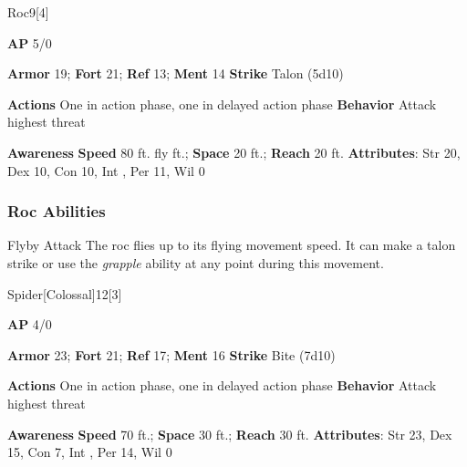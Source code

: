 \begin{monsection}{Roc}{9}[4]
\vspace{-1em}\vspace{-1em}
\begin{spellcontent}
\begin{spelltargetinginfo}
{\textbf{AP} 5/0}

\pari \textbf{Armor} 19;
\textbf{Fort} 21;
\textbf{Ref} 13;
\textbf{Ment} 14
\pari \textbf{Strike} Talon  (5d10)


\pari \textbf{Actions} One in action phase, one in delayed action phase
\pari \textbf{Behavior} Attack highest threat
\end{spelltargetinginfo}
\end{spellcontent}

\begin{monsterfooter}
\pari \textbf{Awareness} 
\pari \textbf{Speed} 80 ft. fly ft.;
\textbf{Space} 20 ft.;
\textbf{Reach} 20 ft.
\pari \textbf{Attributes}:
Str 20,
Dex 10,
Con 10,
Int ,
Per 11,
Wil 0
\end{monsterfooter}
\end{monsection}


\subsubsection{Roc Abilities}

\begin{freeability}{Flyby Attack}
The roc flies up to its flying movement speed.
It can make a talon strike or use the \textit{grapple} ability at any point during this movement.
\end{freeability}

\begin{monsection}{Spider}[Colossal]{12}[3]
\vspace{-1em}\vspace{-1em}
\begin{spellcontent}
\begin{spelltargetinginfo}
{\textbf{AP} 4/0}

\pari \textbf{Armor} 23;
\textbf{Fort} 21;
\textbf{Ref} 17;
\textbf{Ment} 16
\pari \textbf{Strike} Bite  (7d10)


\pari \textbf{Actions} One in action phase, one in delayed action phase
\pari \textbf{Behavior} Attack highest threat
\end{spelltargetinginfo}
\end{spellcontent}

\begin{monsterfooter}
\pari \textbf{Awareness} 
\pari \textbf{Speed} 70 ft.;
\textbf{Space} 30 ft.;
\textbf{Reach} 30 ft.
\pari \textbf{Attributes}:
Str 23,
Dex 15,
Con 7,
Int ,
Per 14,
Wil 0
\end{monsterfooter}
\end{monsection}


